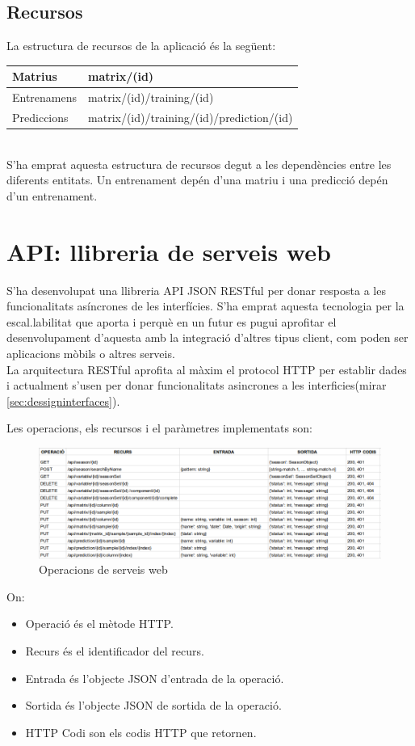 \subsection{Recursos}
La estructura de recursos de la aplicaci\'{o} \'{e}s la següent:\\

\begin{tabular}{| l | l |}
\hline
Matrius       & matrix/(id) \\ \hline
Entrenamens  & matrix/(id)/training/(id) \\ \hline
Prediccions & matrix/(id)/training/(id)/prediction/(id) \\ \hline
\end{tabular}\\

S'ha emprat aquesta estructura de recursos degut a les dependències entre les diferents entitats. Un entrenament dep\'{e}n d'una matriu i una predicci\'{o} dep\'{e}n d'un entrenament.

\section{API: llibreria de serveis web}
S'ha desenvolupat una llibreria API JSON RESTful per donar resposta a les funcionalitats asíncrones de les interfícies.\cite{apijson} S'ha emprat aquesta tecnologia per la escal.labilitat que aporta i perquè en un futur es pugui aprofitar el desenvolupament d'aquesta amb la integració d'altres tipus client, com poden ser aplicacions mòbils o altres serveis.\\

La arquitectura RESTful aprofita al màxim el protocol HTTP per establir dades i actualment s'usen per donar funcionalitats asincrones a les interficies(mirar \ref{sec:dessigninterfaces}).

Les operacions, els recursos i el paràmetres implementats son:\\
\begin{figure}[H]
  \includegraphics[scale=0.5]{img/implementation/apirestul.png}
  \caption{Operacions de serveis web}
  \label{fig:dessignpatters}
\end{figure}
On:
\begin{itemize}
\item Operació \'{e}s el mètode HTTP.
\item Recurs \'{e}s el identificador del recurs.
\item Entrada \'{e}s l'objecte JSON d'entrada de la operació.
\item Sortida \'{e}s l'objecte JSON de sortida de la operació.
\item HTTP Codi son els codis HTTP que retornen.\cite{listhttpcodis}
\end{itemize}

